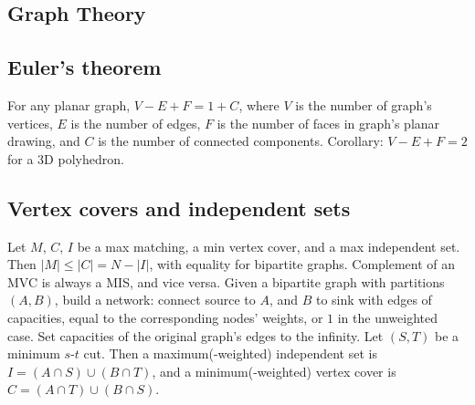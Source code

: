 \documentclass[12pt]{extarticle}
\begin{document}
\begin{multicols*}{2}







\section{Graph Theory}

\subsection{Euler's theorem} For any planar graph, $V - E + F = 1 + C$,
where $V$ is the number of graph's vertices, $E$ is the number of edges,
$F$ is the number of faces in graph's planar drawing, and $C$ is the number
of connected components.  Corollary: $V - E + F = 2$ for a 3D polyhedron.


\subsection{Vertex covers and independent sets}
Let $M$, $C$, $I$ be a max matching, a min vertex cover, and a max independent set.
Then $|M| \le |C| = N - |I|$, with equality for bipartite graphs.
Complement of an MVC is always a MIS, and vice versa.
Given a bipartite graph with partitions $(A, B)$, build a network:
connect source to $A$, and $B$ to sink with edges of capacities, equal to
the corresponding nodes' weights, or $1$ in the unweighted case.
Set capacities of the original graph's edges to the infinity.
Let $(S,T)$ be a minimum $s$-$t$ cut.
Then a maximum(-weighted) independent set is $I = (A \cap S) \cup (B \cap T)$,
and a minimum(-weighted) vertex cover is $C = (A \cap T) \cup (B \cap S)$.


\end{multicols*}
\end{document}
